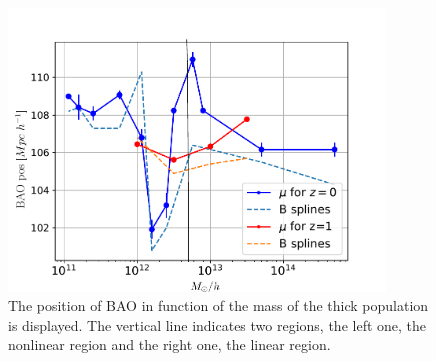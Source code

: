 \begin{figure}[htbp]
       \centering

    \includegraphics[width=100mm]{Images/chapter4/PosvsMh2.pdf}
\caption{\small The position of BAO in function of the mass of the thick population is displayed.
   The vertical line indicates two regions, the left one, the nonlinear region
   and the right one, the linear region. }
       \label{sigm2}
 \end{figure}


